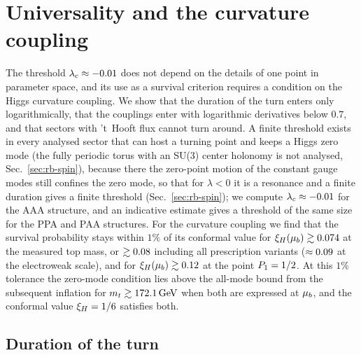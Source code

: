 \section{Universality and the curvature coupling}\label{rep:h-universality}

The threshold $\lambda_c\approx-0.01$ does not depend on the details of one point in parameter space, and its use as a survival criterion requires a condition on the Higgs curvature coupling.
We show that the duration of the turn enters only logarithmically, that the couplings enter with logarithmic derivatives below $0.7$, and that sectors with 't~Hooft flux cannot turn around. %
A finite threshold exists in every analysed sector that can host a turning point and keeps a Higgs zero mode (the fully periodic torus with an SU(3) center holonomy is not analysed, Sec.~\ref{sec:rb-spin}), because there the zero-point motion of the constant gauge modes still confines the zero mode, so that for $\lambda<0$ it is a resonance and a finite duration gives a finite threshold (Sec.~\ref{sec:rb-spin}); we compute $\lambda_c\approx-0.01$ for the AAA structure, and an indicative estimate gives a threshold of the same size for the PPA and PAA structures. %
For the curvature coupling we find that the survival probability stays within $1\%$ of its conformal value for $\xi_H(\mu_b)\gtrsim0.074$ at the measured top mass, or $\gtrsim0.08$ including all prescription variants ($\approx0.09$ at the electroweak scale), and for $\xi_H(\mu_b)\gtrsim0.12$ at the point $P_1=1/2$. %
At this $1\%$ tolerance the zero-mode condition lies above the all-mode bound from the subsequent inflation for $m_t\gtrsim172.1\,\mathrm{GeV}$ when both are expressed at $\mu_b$, and the conformal value $\xi_H=1/6$ satisfies both. %

\subsection{Duration of the turn}
\label{sec:rb-duration}


